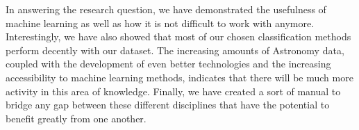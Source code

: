 \documentclass[a4paper, 12pt]{report}
\theoremstyle{definition}
\begin{document}
In answering the research question, we have demonstrated the usefulness of machine learning as well as how it is not difficult to work with anymore. Interestingly, we have also showed that most of our chosen classification methods perform decently with our dataset. The increasing amounts of Astronomy data, coupled with the development of even better technologies and the increasing accessibility to machine learning methods, indicates that there will be much more activity in this area of knowledge. Finally, we have created a sort of manual to bridge any gap between these different disciplines that have the potential to benefit greatly from one another.
 
 \newpage
{}
 
\printbibliography
\end{document}

